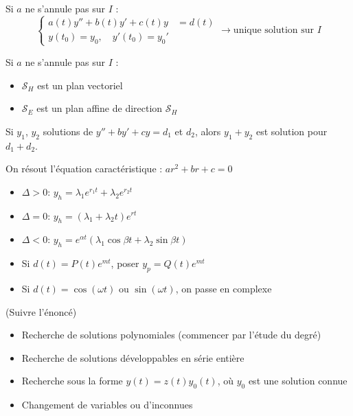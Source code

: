 \documentclass[a4paper,12pt]{report}
\newcommand{\Thm}[2]{\begin{tcolorbox}[colback=white,colframe=Red!60, title=Théorème : #1]#2\end{tcolorbox}}
\newcommand{\Methode}[2]{\begin{tcolorbox}[colback=white, title=Méthode :  #1]#2\end{tcolorbox}}
\begin{document}
\Thm{Problème de Cauchy (ordre 2)}{
Si $a$ ne s’annule pas sur $I$ :\\
\[
\left\{
\begin{aligned}
    a(t)y'' + b(t)y' + c(t)y &= d(t) \\
    y(t_0) = y_0,\quad y'(t_0) = y_0'
\end{aligned}
\right.
\longrightarrow \text{unique solution sur } I
\]
}

\Thm{Structure des solutions (ordre 2)}{
Si $a$ ne s’annule pas sur $I$ :
\begin{itemize}
    \item $\mathcal{S}_H$ est un plan vectoriel
    \item $\mathcal{S}_E$ est un plan affine de direction $\mathcal{S}_H$
\end{itemize}
}

\Thm{Principe de superposition}{
Si $y_1$, $y_2$ solutions de $y''+by'+cy=d_1$ et $d_2$, alors $y_1+y_2$ est solution pour $d_1+d_2$.
}

\Methode{Résolution avec coefficients constants}{
On résout l’équation caractéristique : $ar^2 + br + c = 0$\\
\begin{itemize}
    \item $\Delta > 0$: $y_h = \lambda_1 e^{r_1 t} + \lambda_2 e^{r_2 t}$
    \item $\Delta = 0$: $y_h = (\lambda_1 + \lambda_2 t)e^{r t}$
    \item $\Delta < 0$: $y_h = e^{\alpha t} (\lambda_1 \cos \beta t + \lambda_2 \sin \beta t)$
\end{itemize}
}

\Methode{Trouver une solution particulière (coeff. constants)}{
\begin{itemize}
    \item Si $d(t) = P(t)e^{mt}$, poser $y_p = Q(t)e^{mt}$
    \item Si $d(t) = \cos(\omega t)$ ou $\sin(\omega t)$, on passe en complexe
\end{itemize}
}

\Methode{Résolution avec coefficients non constants}{
(Suivre l’énoncé)
\begin{itemize} 
    \item Recherche de solutions polynomiales (commencer par l’étude du degré)
    \item Recherche de solutions développables en série entière
    \item Recherche sous la forme $y(t) = z(t)y_0(t)$, où $y_0$ est une solution connue 
    \item Changement de variables ou d’inconnues
\end{itemize}
}
\end{document}
